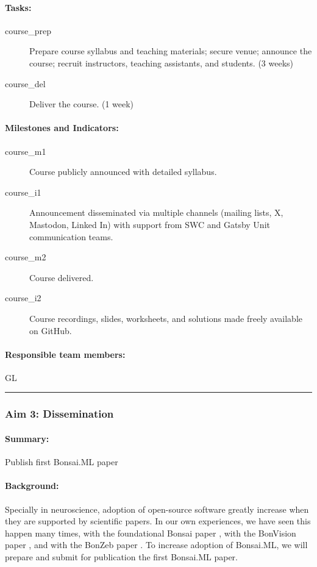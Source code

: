 \paragraph{Tasks:}  

\begin{description}
    \item[course\_prep] Prepare course syllabus and teaching materials; secure venue; announce the course; recruit instructors, teaching assistants, and students. (3 weeks)  
    \item[course\_del] Deliver the course. (1 week)  
\end{description}  

\paragraph{Milestones and Indicators:}  

\begin{description}
    \item[course\_m1] Course publicly announced with detailed syllabus.  
    \item[course\_i1] Announcement disseminated via multiple channels (mailing lists, X, Mastodon, Linked In) with support from SWC and Gatsby Unit communication teams.  
    \item[course\_m2] Course delivered.  
    \item[course\_i2] Course recordings, slides, worksheets, and solutions made freely available on GitHub.  
\end{description}

\paragraph{Responsible team members:} GL

\noindent\rule{\textwidth}{1pt}
\subsubsection{Aim 3: Dissemination}

\paragraph{Summary:} Publish first Bonsai.ML paper

\paragraph{Background:} Specially in neuroscience, adoption of open-source
software greatly increase when they are supported by scientific papers. In our
own experiences, we have seen this happen many times, with the foundational
Bonsai paper \citep{lopesEtAl15}, with the BonVision paper \citep{lopesEtAl21},
and with the BonZeb paper \citep{guilbeaultEtAl21}.
%
To increase adoption of Bonsai.ML, we will prepare and submit for publication
the first Bonsai.ML paper.

